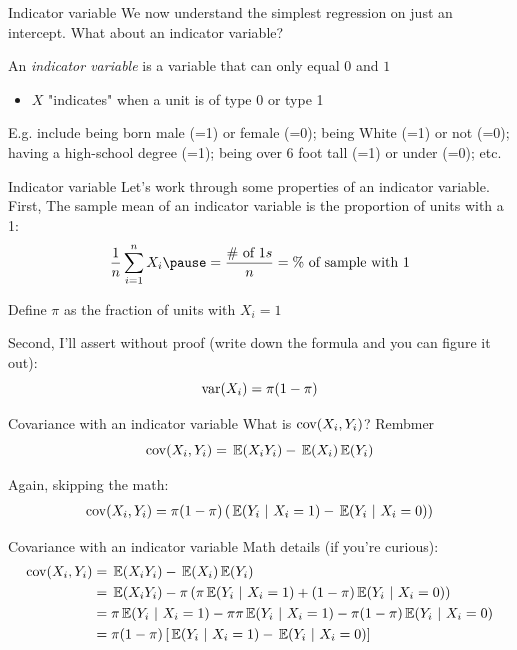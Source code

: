 \documentclass[aspectratio=169,t,11pt,table]{beamer}
\begin{document}
\begin{frame}{Indicator variable}
  We now understand the simplest regression on just an intercept. What about an \alert{indicator variable}? 
  
  An \emph{indicator variable} is a variable that can only equal $0$ and $1$
  \begin{itemize}
    \item $X$ "indicates" when a unit is of type 0 or type 1
  \end{itemize}

  \bigskip
  E.g. include being born male (=1) or female (=0); being White (=1) or not (=0); having a high-school degree (=1); being over 6 foot tall (=1) or under (=0); etc.
\end{frame}

\begin{frame}{Indicator variable}
  Let's work through some properties of an indicator variable. First, The sample mean of an indicator variable is the proportion of units with a 1:
  $$
    \frac{1}{n} \sum_{i=1}^n X_i \pause = \frac{\# \text{ of } 1{s}}{n} = \text{\% of sample with 1}
  $$
  
  Define $\pi$ as the fraction of units with $X_i = 1$ 

  \pause
  \bigskip
  Second, I'll assert without proof (write down the formula and you can figure it out):
  $$
    \var(X_i) = \pi (1 - \pi)
  $$
\end{frame}

\begin{frame}{Covariance with an indicator variable}
  What is $\cov(X_i, Y_i)$? Rembmer
  $$
    \cov(X_i, Y_i) = \expec{X_i Y_i} - \expec{X_i} \expec{Y_i}
  $$
  
  \pause
  \bigskip
  Again, skipping the math:
  \begin{align*}
    \cov(X_i, Y_i) = \pi (1 - \pi) \left( \expec{Y_i}{X_i = 1} - \expec{Y_i}{X_i = 0} \right)
  \end{align*}
\end{frame}

\begin{frame}{Covariance with an indicator variable}
  Math details (if you're curious): 
  \begin{align*}
    \cov(X_i, Y_i) 
    &= \expec{X_i Y_i} - \expec{X_i} \expec{Y_i} \\
    &= \expec{X_i Y_i} - \pi \left( \pi \expec{Y_i}{X_i = 1} + (1 - \pi) \expec{Y_i}{X_i = 0} \right) \\
    &= \pi \expec{Y_i}{X_i = 1} - \pi \pi \expec{Y_i}{X_i = 1} - \pi (1 - \pi) \expec{Y_i}{X_i = 0} \\
    &= \pi (1 - \pi) \left[ \expec{Y_i}{X_i = 1} - \expec{Y_i}{X_i = 0} \right]
  \end{align*}
\end{frame}
\end{document}
